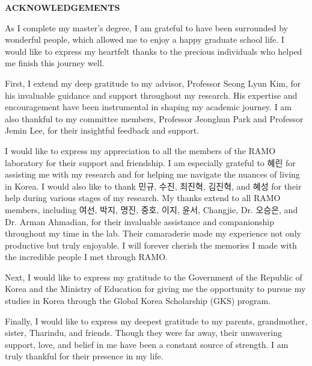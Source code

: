 \clearpage
{}
\begin{centering}
\textbf{ACKNOWLEDGEMENTS}\\
\vspace{\baselineskip}
\end{centering}

As I complete my master’s degree, I am grateful to have been surrounded by wonderful people, which allowed me to enjoy a happy graduate school life. 
I would like to express my heartfelt thanks to the precious individuals who helped me finish this journey well.

First, I extend my deep gratitude to my advisor, Professor Seong Lyun Kim, for his invaluable guidance and support throughout my research. 
His expertise and encouragement have been instrumental in shaping my academic journey. 
I am also thankful to my committee members, Professor Jeonghun Park and Professor Jemin Lee, for their insightful feedback and support.

I would like to express my appreciation to all the members of the RAMO laboratory for their support and friendship. I am especially grateful to
 혜린 for assisting me with my research and for helping me navigate the nuances of living in Korea. I would also like to thank 민규, 수진, 최진혁, 
 김진혁, and 혜성 for their help during various stages of my research. My thanks extend to all RAMO members, including 여선, 박지, 명진, 중호, 이지, 윤서, 
 Changjie, Dr. 오승은, and Dr. Arman Ahmadian, for their invaluable assistance and companionship throughout my time in the lab. Their camaraderie 
 made my experience not only productive but truly enjoyable. I will forever cherish the memories I made with the incredible people I met through RAMO.

Next, I would like to express my gratitude to the Government of the Republic of Korea and the Ministry of Education for giving me the opportunity to 
pursue my studies in Korea through the Global Korea Scholarship (GKS) program.

Finally, I would like to express my deepest gratitude to my parents, grandmother, sister, Tharindu, and friends. Though they were far away, their 
unwavering support, love, and belief in me have been a constant source of strength. I am truly thankful for their presence in my life.

\thispagestyle{empty}
\clearpage
